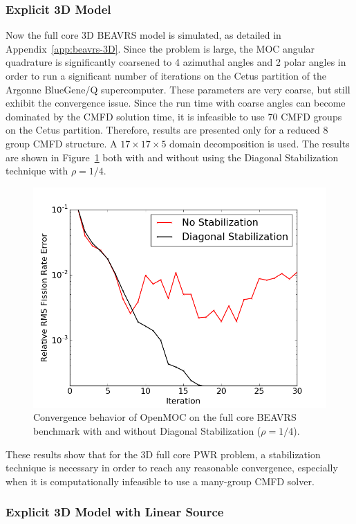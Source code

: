 \subsubsection{Explicit 3D Model}

Now the full core 3D BEAVRS model is simulated, as detailed in Appendix~\ref{app:beavrs-3D}. Since the problem is large, the \ac{MOC} angular quadrature is significantly coarsened to 4 azimuthal angles and 2 polar angles in order to run a significant number of iterations on the Cetus partition of the Argonne BlueGene/Q supercomputer. These parameters are very coarse, but still exhibit the convergence issue. Since the run time with coarse angles can become dominated by the \ac{CMFD} solution time, it is infeasible to use 70 \ac{CMFD} groups on the Cetus partition. Therefore, results are presented only for a reduced 8 group \ac{CMFD} structure. A $17 \times 17 \times 5$ domain decomposition is used. The results are shown in Figure~\ref{fig:fc-3D} both with and without using the Diagonal Stabilization technique with $\rho = 1/4$. 

\begin{figure}[ht!]
	\centering
	\includegraphics[width=0.71\linewidth]{figures/convergence/full-core-3D.png}
	\caption{Convergence behavior of OpenMOC on the full core \ac{BEAVRS} benchmark with and without Diagonal Stabilization ($\rho = 1/4$).}
	\label{fig:fc-3D}
\end{figure}

These results show that for the 3D full core \ac{PWR} problem, a stabilization technique is necessary in order to reach any reasonable convergence, especially when it is computationally infeasible to use a many-group \ac{CMFD} solver.

\subsubsection{Explicit 3D Model with Linear Source}

